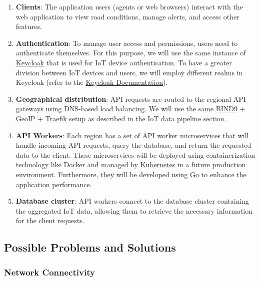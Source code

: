 \documentclass[12pt,a4paper]{article}
\begin{document}
\begin{enumerate}
\item \textbf{Clients}: The application users (agents or web browsers) interact with the web application to view road conditions, manage alerts, and access other features.

\item \textbf{Authentication}: To manage user access and permissions, users need to authenticate themselves. For this purpose, we will use the same instance of \href{https://www.keycloak.org/}{Keycloak} that is used for IoT device authentication. To have a greater division between IoT devices and users, we will employ different realms in Keycloak (refer to the \href{https://www.keycloak.org/docs/latest/server_admin/index.html#core-concepts-and-terms}{Keycloak Documentation}).

\item \textbf{Geographical distribution}: API requests are routed to the regional API gateways using DNS-based load balancing. We will use the same \href{https://www.isc.org/bind/}{BIND9} + \href{https://www.maxmind.com/en/geoip2-databases}{GeoIP} + \href{https://traefik.io/}{Traefik} setup as described in the IoT data pipeline section.

\item \textbf{API Workers}: Each region has a set of API worker microservices that will handle incoming API requests, query the database, and return the requested data to the client. These microservices will be deployed using containerization technology like Docker and managed by \href{https://kubernetes.io/}{Kubernetes} in a future production environment. Furthermore, they will be developed using \href{https://golang.org/}{Go} to enhance the application performance.

\item \textbf{Database cluster}: API workers connect to the database cluster containing the aggregated IoT data, allowing them to retrieve the necessary information for the client requests.
\end{enumerate}

\subsection*{Possible Problems and Solutions}

\subsubsection*{Network Connectivity}
\end{document}
